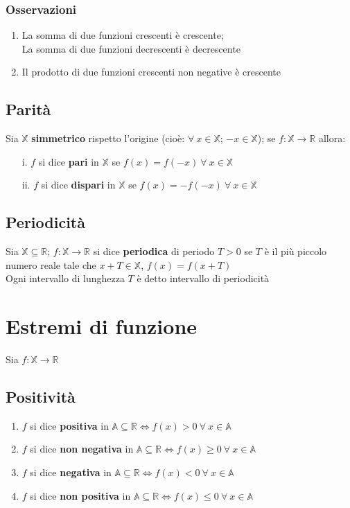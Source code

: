 \subsubsection{Osservazioni}
\begin{enumerate}
\item La somma di due funzioni crescenti è crescente;\\
La somma di due funzioni decrescenti è decrescente
\item Il prodotto di due funzioni crescenti non negative è crescente
\end{enumerate}
\subsection{Parità}
Sia $\mathbb{X}$ \textbf{simmetrico} rispetto l'origine (cioè: $\forall\ x \in \mathbb{X}$; $-x \in \mathbb{X}$); se $f: \mathbb{X} \rightarrow \mathbb{R}$ allora:
\begin{enumerate}
\item[i.] $f$ si dice \textbf{pari} in $\mathbb{X}$ se $f(x) = f(-x)\ \forall\ x \in \mathbb{X}$
\item[ii.] $f$ si dice \textbf{dispari} in $\mathbb{X}$ se $f(x) = -f(-x)\ \forall\ x \in \mathbb{X}$
\end{enumerate}
\subsection{Periodicità}
Sia $\mathbb{X} \subseteq \mathbb{R}$;   $f: \mathbb{X} \rightarrow \mathbb{R}$ si dice \textbf{periodica} di periodo $T>0$ se $T$ è il più piccolo numero reale tale che $x + T \in \mathbb{X}$, $f(x) = f(x + T)$\\
Ogni intervallo di lunghezza $T$ è detto intervallo di periodicità
\section{Estremi di funzione}
Sia $f: \mathbb{X} \rightarrow \mathbb{R}$
\subsection{Positività}
\begin{enumerate}
\item $f$ si dice \textbf{positiva} in $\mathbb{A} \subseteq \mathbb{R} \iff f(x)>0\ \forall\ x \in \mathbb{A}$
\item $f$ si dice \textbf{non negativa} in $\mathbb{A} \subseteq \mathbb{R} \iff f(x) \geq 0\ \forall\ x \in \mathbb{A}$
\item $f$ si dice \textbf{negativa} in $\mathbb{A} \subseteq \mathbb{R} \iff f(x)<0\ \forall\ x \in \mathbb{A}$
\item $f$ si dice \textbf{non positiva} in $\mathbb{A} \subseteq \mathbb{R} \iff f(x) \leq 0\ \forall\ x \in \mathbb{A}$
\end{enumerate}
